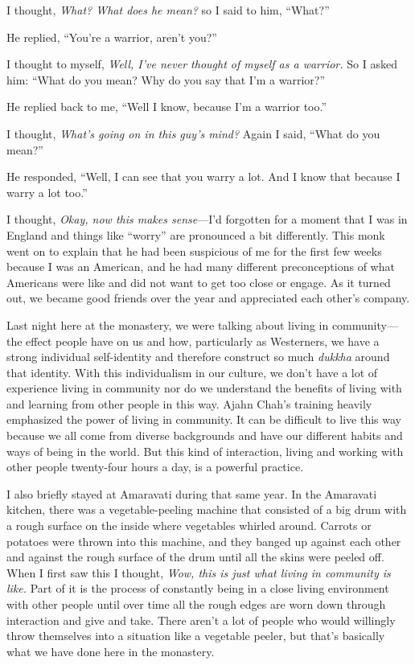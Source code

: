I thought, \emph{What? What does he mean?} so I said to him, ``What?''

He replied, ``You're a warrior, aren't you?''

I thought to myself, \emph{Well, I've never thought of myself as a 
warrior.} So I asked him: ``What do you mean? Why do you say that I'm a 
warrior?''

He replied back to me, ``Well I know, because I'm a warrior too.''

I thought, \emph{What's going on in this guy's mind?} Again I said, 
``What do you mean?''

He responded, ``Well, I can see that you warry a lot. And I know that 
because I warry a lot too.''

I thought, \emph{Okay, now this makes sense}---I'd forgotten for a 
moment that I was in England and things like ``worry'' are pronounced a 
bit differently. This monk went on to explain that he had been 
suspicious of me for the first few weeks because I was an American, and 
he had many different preconceptions of what Americans were like and 
did not want to get too close or engage. As it turned out, we became 
good friends over the year and appreciated each other's company.

Last night here at the monastery, we were talking about living in 
community---the effect people have on us and how, particularly as 
Westerners, we have a strong individual self-identity and therefore 
construct so much \emph{dukkha} around that identity. With this 
individualism in our culture, we don't have a lot of experience living 
in community nor do we understand the benefits of living with and 
learning from other people in this way. Ajahn Chah's training heavily 
emphasized the power of living in community. It can be difficult to 
live this way because we all come from diverse backgrounds and have our 
different habits and ways of being in the world. But this kind of 
interaction, living and working with other people twenty-four hours a 
day, is a powerful practice.

I also briefly stayed at Amaravati during that same year. In the 
Amaravati kitchen, there was a vegetable-peeling machine that consisted 
of a big drum with a rough surface on the inside where vegetables 
whirled around. Carrots or potatoes were thrown into this machine, and 
they banged up against each other and against the rough surface of the 
drum until all the skins were peeled off. When I first saw this I 
thought, \emph{Wow, this is just what living in community is like.} 
Part of it is the process of constantly being in a close living 
environment with other people until over time all the rough edges are 
worn down through interaction and give and take. There aren't a lot of 
people who would willingly throw themselves into a situation like a 
vegetable peeler, but that's basically what we have done here in the 
monastery.

